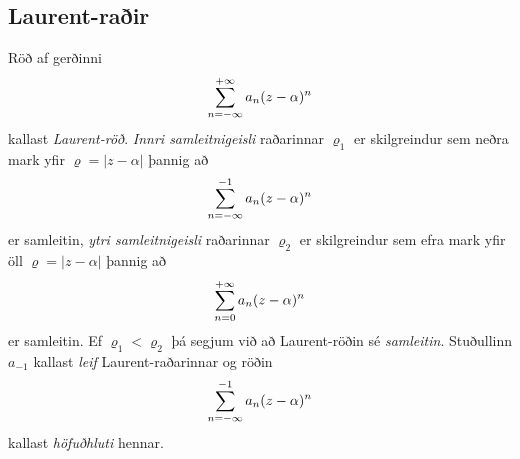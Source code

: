 \subsection*{Laurent-raðir}

\begin{sk}
Röð af gerðinni 
 $$\sum_{n=-\infty}\sp{+\infty}a_n(z-\alpha)\sp n
 $$
kallast {\it Laurent-röð}.  {\it Innri samleitnigeisli
}
raðarinnar $\varrho_1$ er skilgreindur sem neðra mark yfir
$\varrho=|z-\alpha|$ þannig að
$$ \sum_{n=-\infty}\sp{-1} a_n(z-{\alpha})\sp n $$
er samleitin, {\it ytri samleitnigeisli} raðarinnar
$\varrho_2$ er skilgreindur sem efra mark yfir öll $\varrho=|z-\alpha|$
þannig að
$$ \sum_{n=0}\sp{+\infty}a_n(z-{\alpha})\sp n $$
er samleitin. 
Ef $\varrho_1<\varrho_2$ þá segjum við að Laurent-röðin
sé {\it samleitin}.    Stuðullinn $a_{-1}$ kallast {\it
leif}
Laurent-raðarinnar 
og röðin 
$$\sum_{n=-\infty}\sp{-1}a_n(z-{\alpha})\sp n
$$ 
kallast {\it
höfuðhluti}
hennar.
\end{sk}


